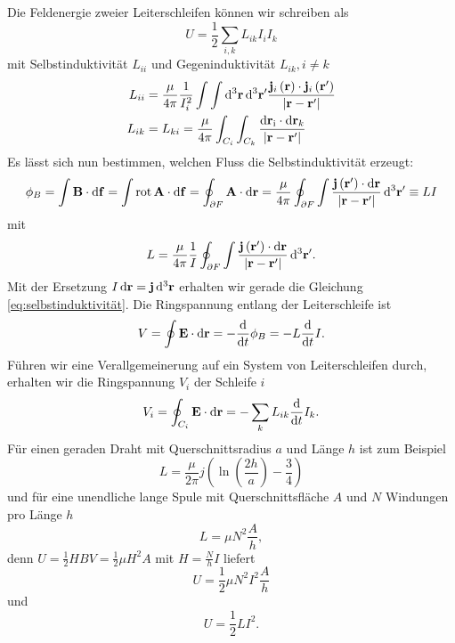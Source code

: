 Die Feldenergie zweier Leiterschleifen können wir schreiben als
\begin{equation*}
	U=\frac{1}{2}\sum _{i,k}L_{ik}I_{i}I_{k}
\end{equation*}
mit Selbstinduktivität $L_{ii}$ und Gegeninduktivität  $L_{ik},i\neq k$
\begin{align}
	\label{eq:selbstinduktivität}
	L_{ii} & =\frac{\mu }{4\pi }\frac{1}{I_{i}^{2}}\int \int \mathop{}\!\mathrm{d} ^{3}\mathbf{r}\mathop{}\!\mathrm{d} ^{3}\mathbf{r}'\frac{\mathbf{j}_{i}\left(\mathbf{r}\right)\cdot \mathbf{j}_{i}\left(\mathbf{r}'\right)}{\left| \mathbf{r}-\mathbf{r}'\right| } \\
	L_{ik} & =L_{ki}=\frac{\mu }{4\pi }\int _{C_{i}}\int _{C_{k}}\frac{\mathop{}\!\mathrm{d} \mathbf{r}_{\mathrm{i}}\cdot \mathop{}\!\mathrm{d} \mathbf{r}_{k}}{\left| \mathbf{r}-\mathbf{r}'\right| }
\end{align}
Es lässt sich nun bestimmen, welchen Fluss die Selbstinduktivität erzeugt:
\begin{equation*}
	\phi _{B}=\int \mathbf{B}\cdot \mathop{}\!\mathrm{d} \mathbf{f}=\int \operatorname{rot} \mathbf{A}\cdot \mathop{}\!\mathrm{d} \mathbf{f}=\oint _{\partial F}\mathbf{A}\cdot \mathop{}\!\mathrm{d} \mathbf{r}=\frac{\mu }{4\pi }\oint _{\partial F}\int \frac{\mathbf{j}\left(\mathbf{r}'\right)\cdot \mathop{}\!\mathrm{d} \mathbf{r}}{\left| \mathbf{r}-\mathbf{r}'\right| }\mathop{}\!\mathrm{d} ^{3}\mathbf{r}'\equiv LI
\end{equation*}
mit
\begin{equation*}
	L=\frac{\mu }{4\pi }\frac{1}{I}\oint _{\partial F}\int \frac{\mathbf{j}\left(\mathbf{r}'\right)\cdot \mathop{}\!\mathrm{d} \mathbf{r}}{\left| \mathbf{r}-\mathbf{r}'\right| }\mathop{}\!\mathrm{d} ^{3}\mathbf{r}'.
\end{equation*}
Mit der Ersetzung $I\mathop{}\!\mathrm{d} \mathbf{r}=\mathbf{j}\mathop{}\!\mathrm{d} ^{3}\mathbf{r}$ erhalten wir gerade die Gleichung \eqref{eq:selbstinduktivität}. Die Ringspannung entlang der Leiterschleife ist
\begin{equation*}
	V=\oint \mathbf{E}\cdot \mathop{}\!\mathrm{d} \mathbf{r}=-\frac{\mathop{}\!\mathrm{d} }{\mathop{}\!\mathrm{d} t}\phi _{B}=-L\frac{\mathop{}\!\mathrm{d} }{\mathop{}\!\mathrm{d} t}I.
\end{equation*}
Führen wir eine Verallgemeinerung auf ein System von Leiterschleifen durch, erhalten wir die Ringspannung $V_{i}$ der Schleife $i$
\begin{equation*}
	V_{i}=\oint _{C_{i}}\mathbf{E}\cdot \mathop{}\!\mathrm{d} \mathbf{r}=-\sum _{k}L_{ik}\frac{\mathop{}\!\mathrm{d} }{\mathop{}\!\mathrm{d} t}I_{k}.
\end{equation*}
Für einen geraden Draht mit Querschnittsradius $a$ und Länge $h$ ist zum Beispiel
\begin{equation*}
	L=\frac{\mu }{2\pi }j\left(\ln \left(\frac{2h}{a}\right)-\frac{3}{4}\right)
\end{equation*}
und für eine unendliche lange Spule mit Querschnittsfläche $A$ und $N$ Windungen pro Länge $h$
\begin{equation*}
	L=\mu N^{2}\frac{A}{h},
\end{equation*}
denn $U=\frac{1}{2}HBV=\frac{1}{2}\mu H^{2}A$ mit $H=\frac{N}{h}I$ liefert
\begin{equation*}
	U=\frac{1}{2}\mu N^{2}I^{2}\frac{A}{h}
\end{equation*}
und
\begin{equation*}
	U=\frac{1}{2}LI^{2}.
\end{equation*}
